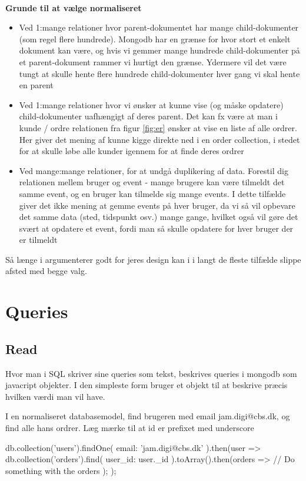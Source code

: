 \documentclass[english,course]{lecture}
\begin{document}
\\\textbf{Grunde til at vælge normaliseret}

\begin{itemize}
	\item Ved 1:mange relationer hvor parent-dokumentet har mange child-dokumenter (som regel flere hundrede). Mongodb har en grænse for hvor stort et enkelt dokument kan være, og hvis vi gemmer mange hundrede child-dokumenter på et parent-dokument rammer vi hurtigt den grænse. Ydermere vil det være tungt at skulle hente flere hundrede child-dokumenter hver gang vi skal hente en parent
	\item Ved 1:mange relationer hvor vi ønsker at kunne vise (og måske opdatere) child-dokumenter uafhængigt af deres parent. Det kan fx være at man i kunde / ordre relationen fra figur \ref{fig:er} ønsker at vise en liste af alle ordrer. Her giver det mening af kunne kigge direkte ned i en order collection, i stedet for at skulle løbe alle kunder igennem for at finde deres ordrer
	\item Ved mange:mange relationer, for at undgå duplikering af data. Forestil dig relationen mellem bruger og event - mange brugere kan være tilmeldt det samme event, og en bruger kan tilmelde sig mange events. I dette tilfælde giver det ikke mening at gemme events på hver bruger, da vi så vil opbevare det samme data (sted, tidspunkt osv.) mange gange, hvilket også vil gøre det svært at opdatere et event, fordi man så skulle opdatere for hver bruger der er tilmeldt
\end{itemize}

Så længe i argumenterer godt for jeres design kan i i langt de fleste tilfælde slippe afsted med begge valg.

\section{Queries}

\subsection{Read}
Hvor man i SQL skriver sine queries som tekst, beskrives queries i mongodb som javacript objekter. I den simpleste form bruger et objekt til at beskrive præcis hvilken værdi man vil have.

\begin{listing}[H]
\caption{I en normaliseret databasemodel, find brugeren med email jam.digi@cbs.dk, og find alle hans ordrer. Læg mærke til at id er prefixet med underscore}
\begin{jscode}
db.collection('users').findOne({
	email: 'jam.digi@cbs.dk'
}).then(user => {
	db.collection('orders').find({
		user_id: user._id
	}).toArray().then(orders => {
		// Do something with the orders
	});
});
\end{jscode}
\end{listing}
\end{document}
